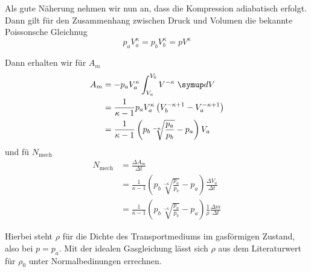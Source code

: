 Als gute N\"aherung nehmen wir nun an, dass die Kompression adiabatisch erfolgt. Dann gilt 
f\"ur den Zusammenhang zwischen Druck und Volumen die bekannte Poissonsche Gleichnug
\begin{equation}
	p_a V_a^\kappa = p_b V_b^\kappa = p V^\kappa
	\label{eqn:poissonsche_Gleichung}
\end{equation}

Dann erhalten wir f\"ur $A_m$
\begin{align}
	A_m 
	&= -p_a V_a^\kappa \int_{V_a}^{V_b} V^{-\kappa} \; \symup dV
	\\
	&= \frac{1}{\kappa - 1} p_a V_a^\kappa \left(V_b^{-\kappa+1} - V_a^{-\kappa +1} \right)
	\\
	&= \frac{1}{\kappa - 1} \left( p_b \sqrt[-\kappa]{\frac{p_a}{p_b}} - p_a \right) V_a
	\label{eqn:a_m}
\end{align}
und f\"u $N_\text{mech}$
\begin{align}
	N_\text{mech}
	&= \frac{\Delta A_m}{\Delta t}
	\\
	&= \frac{1}{\kappa - 1}  \left( p_b \sqrt[-\kappa]{\frac{p_a}{p_b}} - p_a \right) 
	\frac{\Delta V_a}{\Delta t}
	\\
	&=  \frac{1}{\kappa - 1}  \left( p_b \sqrt[-\kappa]{\frac{p_a}{p_b}} - p_a \right)
	\frac{1}{\rho} \frac{\Delta m}{\Delta t}
	\label{eqn:kompressorleistung}
\end{align}

Hierbei steht $\rho$ f\"ur die Dichte des Transportmediums im gasf\"ormigen Zustand, also 
bei $p = p_a$. Mit der idealen Gasgleichung l\"asst sich $\rho$ aus dem Literaturwert f\"ur
$\rho_0$ unter Normalbedinungen errechnen.
